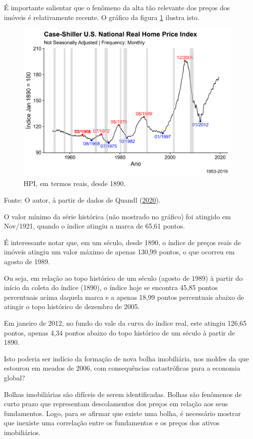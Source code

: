 \documentclass[
	12pt,				%
	oneside,			%
	a4paper,			%
	chapter=TITLE,		%
	section=TITLE,		%
	english,			%
	brazil				%
	]{abntex2}
\newcommand{\bcenter}{\begin{center}}
\newcommand{\ecenter}{\end{center}}
\begin{document}
É importante salientar que o fenômeno da alta tão relevante dos preços dos
imóveis é relativamente recente. O gráfico da figura \ref{fig:rhpi2} ilustra
isto.
\begin{figure}[H]

{\centering \includegraphics[width=0.7\linewidth]{images/rhpi2-1} 

}

\caption{HPI, em termos reais, desde 1890.}\label{fig:rhpi2}
\end{figure}
\bcenter

Fonte: O autor, à partir de dados de Quandl (\protect\hyperlink{ref-QuandlWIKI}{2020}).
\ecenter

O valor mínimo da série histórica (não mostrado no gráfico) foi atingido em\\
Nov/1921, quando o índice atingiu a marca
de 65,61 pontos.

É interessante notar que, em um século, desde 1890, o índice de preços reais de
imóveis atingiu um valor máximo de apenas
130,99 pontos, o
que ocorreu em agosto de 1989.

Ou seja, em relação ao topo histórico de um século (agosto de 1989) à partir do
início da coleta do índice (1890), o índice hoje se encontra
45,85
pontos percentuais acima daquela marca e a apenas
18,99
pontos percentuais abaixo de atingir o topo histórico de dezembro de 2005.

Em janeiro de 2012, no fundo do vale da curva do índice real, este atingiu
126,65 pontos,
apenas 4,34 pontos abaixo do topo histórico
de um século à partir de 1890.

Isto poderia ser indício da formação de nova bolha imobiliária, nos moldes da
que estourou em meados de 2006, com consequências catastróficas para a economia
global?

Bolhas imobiliárias são difíceis de serem identificadas. Bolhas são fenômenos
de curto prazo que representam descolamentos dos preços em relação aos seus
fundamentos. Logo, para se afirmar que existe uma bolha, é necessário mostrar
que inexiste uma correlação entre os fundamentos e os preços dos ativos
imobiliários.
\end{document}
